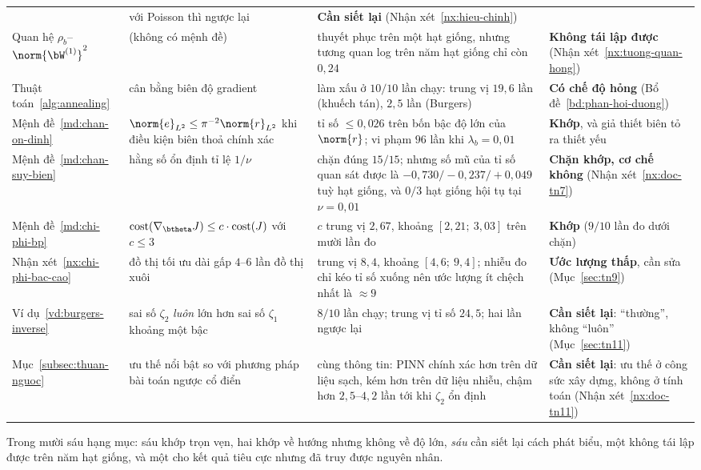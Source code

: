 \begin{longtable}{@{}p{2.9cm}p{3.7cm}p{3.9cm}p{3.0cm}@{}}
& với Poisson thì ngược lại
& \textbf{Cần siết lại} (Nhận xét~\ref{nx:hieu-chinh}) \\[4pt]
Quan hệ $\rho_b$--$\norm{\bW^{(1)}}^2$
& (không có mệnh đề)
& thuyết phục trên một hạt giống, nhưng tương quan log trên năm hạt giống chỉ
  còn $0{,}24$
& \textbf{Không tái lập được} (Nhận xét~\ref{nx:tuong-quan-hong}) \\[4pt]
Thuật toán~\ref{alg:annealing}
& cân bằng biên độ gradient
& làm xấu ở $10/10$ lần chạy: trung vị $19{,}6$ lần (khuếch tán), $2{,}5$ lần
  (Burgers)
& \textbf{Có chế độ hỏng} (Bổ đề~\ref{bd:phan-hoi-duong}) \\[4pt]
Mệnh đề~\ref{md:chan-on-dinh}
& $\norm{e}_{L^2}\le \pi^{-2}\norm{r}_{L^2}$ khi điều kiện biên thoả chính xác
& tỉ số $\le 0{,}026$ trên bốn bậc độ lớn của $\norm{r}$; vi phạm $96$ lần khi
  $\lambda_b = 0{,}01$
& \textbf{Khớp}, và giả thiết biên tỏ ra thiết yếu \\[4pt]
Mệnh đề~\ref{md:chan-suy-bien}
& hằng số ổn định tỉ lệ $1/\nu$
& chặn đúng $15/15$; nhưng số mũ của tỉ số quan sát được là
  $-0{,}730 / -0{,}237 / +0{,}049$ tuỳ hạt giống, và $0/3$ hạt giống hội tụ tại
  $\nu = 0{,}01$
& \textbf{Chặn khớp, cơ chế không} (Nhận xét~\ref{nx:doc-tn7}) \\[4pt]
Mệnh đề~\ref{md:chi-phi-bp}
& $\mathrm{cost}(\nabla_{\btheta}J) \le c\cdot\mathrm{cost}(J)$ với $c\le 3$
& $c$ trung vị $2{,}67$, khoảng $[2{,}21;\ 3{,}03]$ trên mười lần đo
& \textbf{Khớp} ($9/10$ lần đo dưới chặn) \\[4pt]
Nhận xét~\ref{nx:chi-phi-bac-cao}
& đồ thị tối ưu dài gấp $4$--$6$ lần đồ thị xuôi
& trung vị $8{,}4$, khoảng $[4{,}6;\ 9{,}4]$; nhiễu đo chỉ kéo tỉ số xuống nên
  ước lượng ít chệch nhất là $\approx 9$
& \textbf{Ước lượng thấp}, cần sửa (Mục~\ref{sec:tn9}) \\[4pt]
Ví dụ~\ref{vd:burgers-inverse}
& sai số $\zeta_2$ \emph{luôn} lớn hơn sai số $\zeta_1$ khoảng một bậc
& $8/10$ lần chạy; trung vị tỉ số $24{,}5$; hai lần ngược lại
& \textbf{Cần siết lại}: ``thường'', không ``luôn'' (Mục~\ref{sec:tn11}) \\[4pt]
Mục~\ref{subsec:thuan-nguoc}
& ưu thế nổi bật so với phương pháp bài toán ngược cổ điển
& cùng thông tin: PINN chính xác hơn trên dữ liệu sạch, kém hơn trên dữ liệu
  nhiễu, chậm hơn $2{,}5$--$4{,}2$ lần tới khi $\zeta_2$ ổn định
& \textbf{Cần siết lại}: ưu thế ở công sức xây dựng, không ở tính toán
  (Nhận xét~\ref{nx:doc-tn11})
\end{longtable}
\endgroup
 
Trong mười sáu hạng mục: sáu khớp trọn vẹn, hai khớp về hướng nhưng không về độ
lớn, \emph{sáu} cần siết lại cách phát biểu, một không tái lập được trên năm hạt
giống, và một cho kết quả tiêu cực nhưng đã truy được nguyên nhân.

